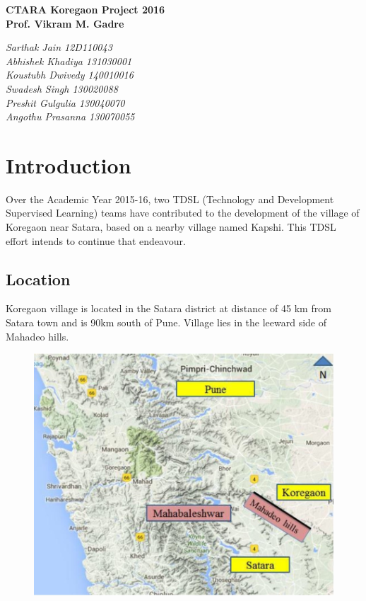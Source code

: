 \documentclass{article}
\begin{document}
\begin{titlepage}
   \begin{center}
      \Large\textbf{CTARA Koregaon Project 2016}\\
      
      \large\textbf{Prof. Vikram M. Gadre}
      
      \large\textit{Sarthak Jain 12D110043}
      \\
      \large\textit{Abhishek Khadiya 131030001}
      \\
      \large\textit{Koustubh Dwivedy 140010016}
      \\
      \large\textit{Swadesh Singh 130020088}
      \\
      \large\textit{Preshit Gulgulia 130040070}
      \\
      \large\textit{Angothu Prasanna 130070055}
   \end{center}
\end{titlepage}

\tableofcontents

\newpage
\section{Introduction}
Over the Academic Year 2015-16, two TDSL (Technology and Development Supervised Learning) teams have contributed to the development of the village of Koregaon near Satara, based on a nearby village named Kapshi. This TDSL effort intends to continue that endeavour.

\subsection{Location}
Koregaon village is located in the Satara district at distance of 45 km from Satara town and is 90km
south of Pune. Village lies in the leeward side of Mahadeo hills.
\begin{figure}[h]
\begin{center}
  \includegraphics[scale=0.4]{images/location.jpg}
\end{center}
\end{figure}
\end{document}
